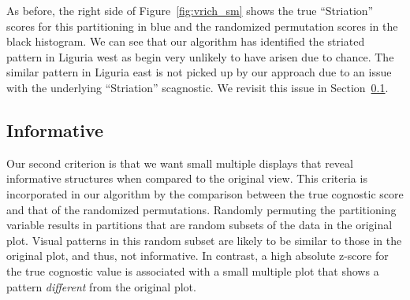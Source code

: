 As before, the right side of Figure~\ref{fig:vrich_sm} shows the true ``Striation'' scores for this partitioning in blue and the randomized permutation scores in the black histogram. We can see that our algorithm has identified the striated pattern in Liguria west as begin very unlikely to have arisen due to chance. The similar pattern in Liguria east is not picked up by our approach due to an issue with the underlying ``Striation'' scagnostic. We revisit this issue in Section~\ref{}.

\subsection{Informative}
Our second criterion is that we want small multiple displays that reveal informative structures when compared to the original view. This criteria is incorporated in our algorithm by the comparison between the true cognostic score and that of the randomized permutations. Randomly permuting the partitioning variable results in partitions that are random subsets of the data in the original plot. Visual patterns in this random subset are likely to be similar to those in the original plot, and thus, not informative. In contrast, a high absolute z-score for the true cognostic value is associated with a small multiple plot that shows a pattern \emph{different} from the original plot.

